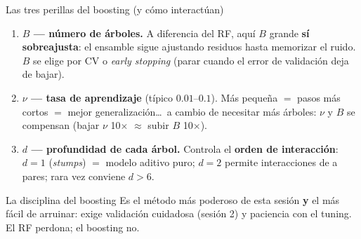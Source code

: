 \documentclass{beamer}
\newcommand{\1}{\mathbb{I}}
\begin{document}
\begin{frame}{Las tres perillas del boosting (y cómo interactúan)}
\small
\begin{enumerate}\itemsep5pt
  \item \textbf{$B$ --- número de árboles.} A diferencia del RF, aquí $B$ grande \textbf{sí sobreajusta}: el ensamble sigue ajustando residuos hasta memorizar el ruido. $B$ se elige por CV o \emph{early stopping} (parar cuando el error de validación deja de bajar). \pause
  \item \textbf{$\nu$ --- tasa de aprendizaje} (típico $0.01$--$0.1$). Más pequeña $=$ pasos más cortos $=$ mejor generalización\ldots\ a cambio de necesitar más árboles: $\nu$ y $B$ se compensan (bajar $\nu$ 10$\times$ $\approx$ subir $B$ 10$\times$). \pause
  \item \textbf{$d$ --- profundidad de cada árbol.} Controla el \textbf{orden de interacción}: $d = 1$ (\emph{stumps}) $=$ modelo aditivo puro; $d = 2$ permite interacciones de a pares; rara vez conviene $d > 6$. \pause
\end{enumerate}

\vspace{0.1cm}
\begin{block}{La disciplina del boosting}
Es el método más poderoso de esta sesión \textbf{y} el más fácil de arruinar: exige validación cuidadosa (sesión 2) y paciencia con el tuning. El RF perdona; el boosting no.
\end{block}
\end{frame}
\end{document}
